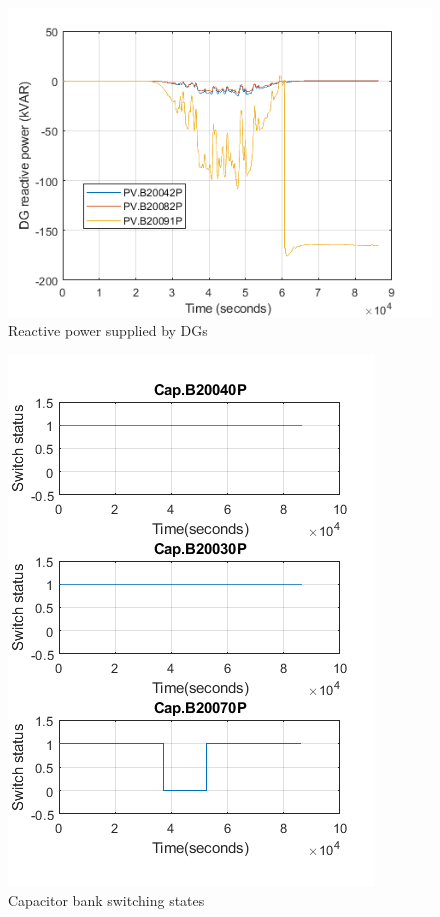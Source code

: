 \begin{figure}[!h]
\centering
\includegraphics[width=\linewidth]{figs/DG_Q.png}
\caption{Reactive power supplied by DGs}
\label{fig:DG_Q}
\end{figure}

\begin{figure}[!h]
\centering
\includegraphics[width=\linewidth]{figs/CAP_BANK.png}
\caption{Capacitor bank switching states}
\label{fig:cap_bank}
\end{figure}

